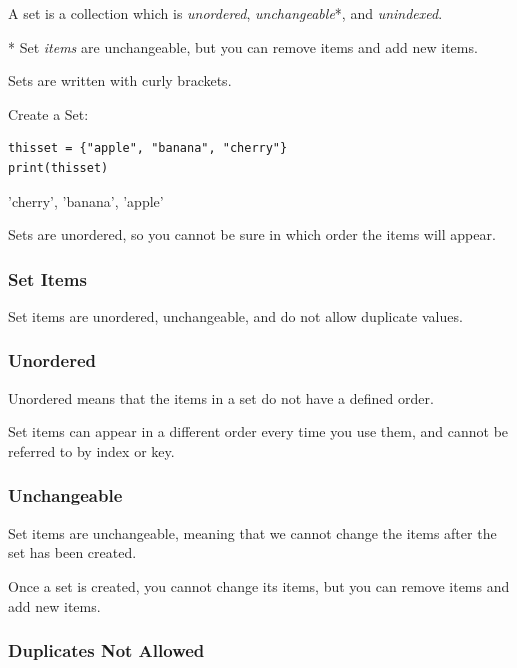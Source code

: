 \documentclass[12pt,a4paper]{article}
\begin{document}
A set is a collection which is \textit{unordered}, \textit{unchangeable}*, and
\textit{unindexed}.

\begin{nbox}
* Set \textit{items} are unchangeable, but you can remove items and add new items.
\end{nbox}

Sets are written with curly brackets.

\begin{ebox}
	Create a Set:
	\begin{lstlisting}
thisset = {"apple", "banana", "cherry"}
print(thisset)
	\end{lstlisting}
\tcblower
	\begin{vercode}
{'cherry', 'banana', 'apple'}
	\end{vercode}
\end{ebox}

\begin{nbox}
Sets are unordered, so you cannot be sure in which order the items will appear.
\end{nbox}

\subsubsection{Set Items}

Set items are unordered, unchangeable, and do not allow duplicate values.
\subsubsection{Unordered}

Unordered means that the items in a set do not have a defined order.

Set items can appear in a different order every time you use them, and cannot
be referred to by index or key.
\subsubsection{Unchangeable}

Set items are unchangeable, meaning that we cannot change the items after the
set has been created.

\begin{nbox}
Once a set is created, you cannot change its items, but you can remove items
and add new items.
\end{nbox}
\subsubsection{Duplicates Not Allowed}
\end{document}
